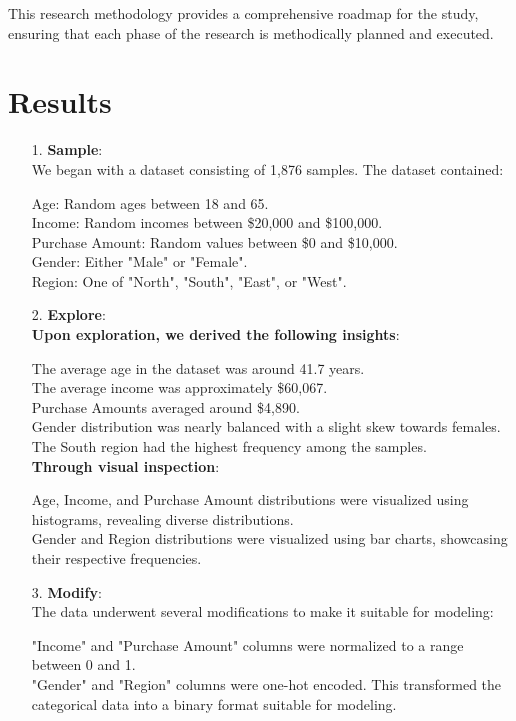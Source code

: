 \documentclass{article}
\begin{document}
This research methodology provides a comprehensive roadmap for the study, ensuring that each phase of the research is methodically planned and executed.

\section*{Results} 
\begin{itemize}
    \item[1.]\textbf{Sample}:\\
    We began with a dataset consisting of 1,876 samples. The dataset contained:

Age: Random ages between 18 and 65.\\
Income: Random incomes between \$20,000 and \$100,000.\\
Purchase Amount: Random values between \$0 and \$10,000.\\
Gender: Either "Male" or "Female".\\
Region: One of "North", "South", "East", or "West".
\item[2.]\textbf{Explore}:\\
\textbf{Upon exploration, we derived the following insights}:

The average age in the dataset was around 41.7 years.\\
The average income was approximately \$60,067.\\
Purchase Amounts averaged around \$4,890.\\
Gender distribution was nearly balanced with a slight skew towards females.\\
The South region had the highest frequency among the samples.\\
\textbf{Through visual inspection}:

Age, Income, and Purchase Amount distributions were visualized using histograms, revealing diverse distributions.\\
Gender and Region distributions were visualized using bar charts, showcasing their respective frequencies.
\item[3.]\textbf{Modify}:\\The data underwent several modifications to make it suitable for modeling:

"Income" and "Purchase Amount" columns were normalized to a range between 0 and 1.\\
"Gender" and "Region" columns were one-hot encoded. This transformed the categorical data into a binary format suitable for modeling.


\end{itemize}
\end{document}
